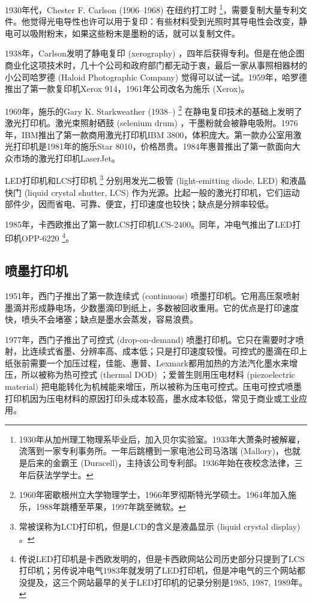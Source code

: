 1930年代，Chester F. Carlson (1906--1968)\indexCarlson{} 在纽约打工时 \footnote{1930年从加州理工物理系毕业后，加入贝尔实验室。1933年大萧条时被解雇，流落到一家专利事务所。一年后跳槽到一家电池公司马洛瑞 (Mallory)，也就是后来的金霸王 (Duracell)，主持该公司专利部。1936年始在夜校念法律，三年后获法学学士。}，需要复制大量专利文件。他觉得光电导性也许可以用于复印：有些材料受到光照时其导电性会改变，静电可以吸附粉末，如果这些粉末是墨粉的话，就可以复制文件。

1938年，Carlson发明了静电复印 (xerography) ，四年后获得专利。但是在他企图商业化这项技术时，几十个公司和政府部门都无动于衷，最后一家从事照相器材的小公司哈罗德 (Haloid Photographic Company)\indexHaloid{} 觉得可以试一试。1959年，哈罗德推出了第一款复印机Xerox 914，1961年公司改名为施乐 (Xerox)\indexXerox{}。

1969年，施乐的Gary K. Starkweather (1938--)\indexStarkweather{} \footnote{1960年密歇根州立大学物理学士，1966年罗彻斯特光学硕士。1964年加入施乐，1988年跳槽至苹果，1997年跳至微软。} 在静电复印技术的基础上发明了激光打印机。激光束照射硒鼓 (selenium drum) ，干墨粉就会被静电吸附。1976年，IBM\indexIBM{}推出了第一款商用激光打印机IBM 3800，体积庞大。第一款办公室用激光打印机是1981年的施乐Star 8010，价格昂贵。1984年惠普\indexHP{}推出了第一款面向大众市场的激光打印机LaserJet。

LED打印机和LCS打印机 \footnote{常被误称为LCD打印机，但是LCD的含义是液晶显示 (liquid crystal display) 。} 分别用发光二极管 (light-emitting diode, LED) 和液晶快门 (liquid crystal shutter, LCS) 作为光源。比起一般的激光打印机，它们运动部件少，因而省电、可靠、便宜，打印速度也较快；缺点是分辨率较低。

1985年，卡西欧\indexCasio{}推出了第一款LCS打印机LCS-2400。同年，冲电气\indexOki{}推出了LED打印机OPP-6220 \footnote{传说LED打印机是卡西欧发明的，但是卡西欧网站公司历史部分只提到了LCS打印机；另传说冲电气1983年就发明了LED打印机，但是冲电气的三个网站都没提及，这三个网站最早的关于LED打印机的记录分别是1985, 1987, 1989年。}。

\subsection{喷墨打印机}

1951年，西门子\indexSiemens{}推出了第一款连续式 (continuous) 喷墨打印机。它用高压泵喷射墨滴并形成静电场，少数墨滴印到纸上，多数被回收重用。它的优点是打印速度快，喷头不会堵塞；缺点是墨水会蒸发，容易浪费。

1977年，西门子推出了可控式 (drop-on-demand) 喷墨打印机。它只在需要时才喷射，比连续式省墨、分辨率高、成本低；只是打印速度较慢。可控式的墨滴在印上纸张前需要一个加压过程，佳能\indexCanon{}、惠普\indexHP{}、Lexmark\indexLexmark{}都用加热的方法汽化墨水来增压，所以被称为热可控式 (thermal DOD) ；爱普生\indexEpson{}则用压电材料 (piezoelectric material) 把电能转化为机械能来增压，所以被称为压电可控式。压电可控式喷墨打印机因为压电材料的原因打印头成本较高，墨水成本较低，常见于商业或工业应用。

